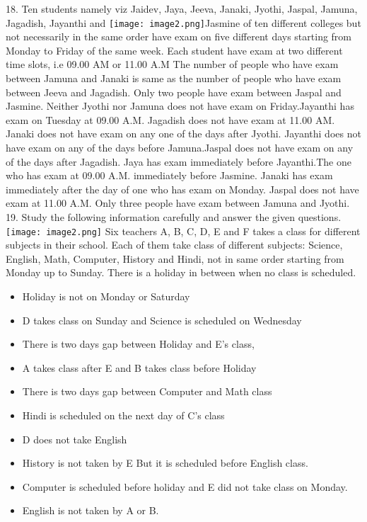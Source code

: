 \documentclass[
]{article}
\begin{document}
18. Ten students namely viz Jaidev, Jaya, Jeeva, Janaki, Jyothi, Jaspal, Jamuna, Jagadish,
Jayanthi and \texttt{[image: image2.png]}Jasmine of ten different colleges but not necessarily in the same order have
exam on five different days starting from Monday to Friday of the same week. Each student
have exam at two different time slots, i.e 09.00 AM or 11.00 A.M The number of people who
have exam between Jamuna and Janaki is same as the number of people who have exam
between Jeeva and Jagadish. Only two people have exam between Jaspal and Jasmine.
Neither Jyothi nor Jamuna does not have exam on Friday.Jayanthi has exam on Tuesday at
09.00 A.M. Jagadish does not have exam at 11.00 AM. Janaki does not have exam on any one
of the days after Jyothi. Jayanthi does not have exam on any of the days before
Jamuna.Jaspal does not have exam on any of the days after Jagadish. Jaya has exam
immediately before Jayanthi.The one who has exam at 09.00 A.M. immediately before
Jasmine. Janaki has exam immediately after the day of one who has exam on Monday.
Jaspal does not have exam at 11.00 A.M. Only three people have exam between Jamuna and
Jyothi.\\

19. Study the following information carefully and answer the given questions.\\
\texttt{[image: image2.png]}
Six teachers A, B,
C, D, E and F takes a class for different subjects in their school. Each of them take class of
different subjects: Science, English, Math, Computer, History and Hindi, not in same order
starting from Monday up to Sunday. There is a holiday in between when no class is
scheduled.\\
\begin{itemize}
    \item Holiday is not on Monday or Saturday
\item D takes class on Sunday and Science is scheduled on Wednesday
\item There is two days gap between Holiday and E’s class,
\item A takes class after E and B takes class before Holiday
\item There is two days gap between Computer and Math class
\item Hindi is scheduled on the next day of C's class
\item D does not take English
\item History is not taken by E But it is scheduled before English class.
\item Computer is scheduled before holiday and E did not take class on Monday.
\item English is not taken by A or B.
\end{itemize}
\end{document}
